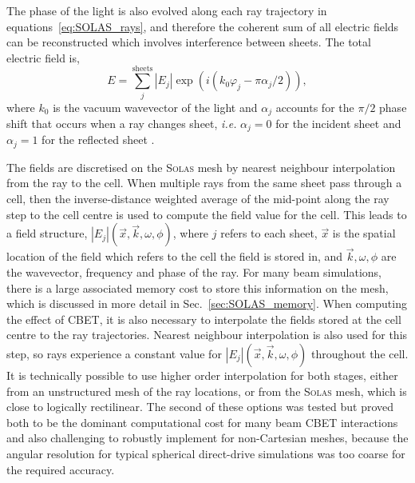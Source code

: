 The phase of the light is also evolved along each ray trajectory in equations~\ref{eq:SOLAS_rays}, and therefore the coherent sum of all electric fields can be reconstructed which involves interference between sheets.
The total electric field is,
\begin{equation}%
    \label{eq:SOLAS_Ecoherent}
    E = \sum_{j}^{\text{sheets}} |E_j|\exp{\left( i(k_0\varphi_j-\pi\alpha_j/2) \right)},
\end{equation}
where $k_0$ is the vacuum wavevector of the light and $\alpha_j$ accounts for the $\pi/2$ phase shift that occurs when a ray changes sheet, \textit{i.e.} $\alpha_j=0$ for the incident sheet and $\alpha_j=1$ for the reflected sheet \cite{follett_validation_2022}.

The fields are discretised on the \textsc{Solas} mesh by nearest neighbour interpolation from the ray to the cell.
When multiple rays from the same sheet pass through a cell, then the inverse-distance weighted average of the mid-point along the ray step to the cell centre is used to compute the field value for the cell.
This leads to a field structure, $|E_j|(\vec{x},\vec{k},\omega,\phi)$, where $j$ refers to each sheet, $\vec{x}$ is the spatial location of the field which refers to the cell the field is stored in, and $\vec{k},\omega,\phi$ are the wavevector, frequency and phase of the ray.
For many beam simulations, there is a large associated memory cost to store this information on the mesh, which is discussed in more detail in Sec.~\ref{sec:SOLAS_memory}.
When computing the effect of \ac{CBET}, it is also necessary to interpolate the fields stored at the cell centre to the ray trajectories.
Nearest neighbour interpolation is also used for this step, so rays experience a constant value for $|E_j|(\vec{x},\vec{k},\omega,\phi)$ throughout the cell.
It is technically possible to use higher order interpolation for both stages, either from an unstructured mesh of the ray locations, or from the \textsc{Solas} mesh, which is close to logically rectilinear.
The second of these options was tested but proved both to be the dominant computational cost for many beam \ac{CBET} interactions and also challenging to robustly implement for non-Cartesian meshes, because the angular resolution for typical spherical direct-drive simulations was too coarse for the required accuracy.

